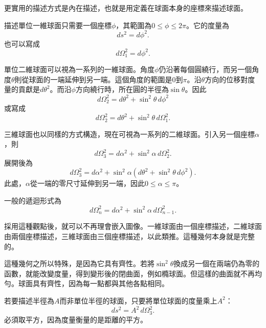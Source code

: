 更實用的描述方式是內在描述，也就是用定義在球面本身的座標來描述球面。

描述單位一維球面只需要一個座標\(\phi\)，其範圍為\(0\leq \phi \leq 2\pi\)。它的度量為
\begin{equation}
ds^2=d\phi^2.
\end{equation}
也可以寫成
\begin{equation}
d\Omega_1^2=d\phi^2.
\end{equation}

單位二維球面可以視為一系列的一維球面。角度\(\phi\)仍沿著每個圓繞行，而另一個角度\(\theta\)則從球面的一端延伸到另一端。這個角度的範圍是\(0\)到\(\pi\)。沿\(\theta\)方向的位移對度量的貢獻是\(d\theta^2\)。而沿\(\phi\)方向繞行時，所在圓的半徑為\(\sin\theta\)。因此
\begin{equation}
d\Omega_2^2=d\theta^2+\sin^2\theta\,d\phi^2
\end{equation}
或寫成
\begin{equation}
d\Omega_2^2=d\theta^2+\sin^2\theta\,d\Omega_1^2.
\end{equation}

三維球面也以同樣的方式構造，現在可視為一系列的二維球面。引入另一個座標\(\alpha\)，則
\begin{equation}
d\Omega_3^2=d\alpha^2+\sin^2\alpha\,d\Omega_2^2.
\end{equation}
展開後為
\begin{equation}
d\Omega_3^2=d\alpha^2+\sin^2\alpha\left(d\theta^2+\sin^2\theta\,d\phi^2\right).
\end{equation}
此處，\(\alpha\)從一端的零尺寸延伸到另一端，因此\(0\leq \alpha \leq \pi\)。

一般的遞迴形式為
\begin{equation}
d\Omega_n^2=d\alpha^2+\sin^2\alpha\,d\Omega_{n-1}^2.
\end{equation}

採用這種觀點後，就可以不再理會嵌入圖像。一維球面由一個座標描述，二維球面由兩個座標描述，三維球面由三個座標描述，以此類推。這種幾何本身就是完整的。

這種幾何之所以特殊，是因為它具有齊性。若將\(\sin^2\theta\)換成另一個在兩端仍為零的函數，就能改變度量，得到變形後的閉曲面，例如橢球面。但這樣的曲面就不再均勻。球面具有齊性，因為每一點都與其他各點相同。

若要描述半徑為\(A\)而非單位半徑的球面，只要將單位球面的度量乘上\(A^2\)：
\begin{equation}
ds^2=A^2\,d\Omega_3^2.
\end{equation}
必須取平方，因為度量衡量的是距離的平方。

